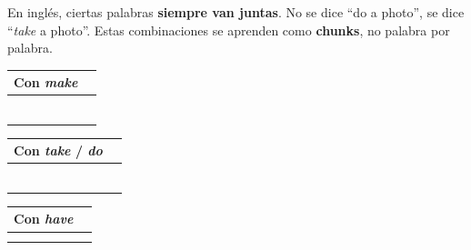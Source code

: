 \documentclass[12pt,a4paper]{article}
\begin{document}
\begin{cajachunk}
En inglés, ciertas palabras \textbf{siempre van juntas}. No se dice ``do a photo'', se dice ``\textit{take} a photo''. Estas combinaciones se aprenden como \textbf{chunks}, no palabra por palabra.

\medskip
\begin{multicols}{2}
\begin{tabularx}{\linewidth}{@{} l X @{}}
\toprule
\textbf{Con \textit{make}} & \\
\midrule
\eng{make a mistake} & \esp{cometer un error} \\
\eng{make a decision} & \esp{tomar una decisión} \\
\eng{make breakfast} & \esp{preparar el desayuno} \\
\eng{make money} & \esp{ganar dinero} \\
\eng{make a noise} & \esp{hacer ruido} \\
\eng{make friends} & \esp{hacer amigos} \\
\bottomrule
\end{tabularx}

\columnbreak

\begin{tabularx}{\linewidth}{@{} l X @{}}
\toprule
\textbf{Con \textit{take} / \textit{do}} & \\
\midrule
\eng{take a photo} & \esp{tomar una foto} \\
\eng{take a shower} & \esp{ducharse} \\
\eng{take a break} & \esp{tomar un descanso} \\
\eng{do homework} & \esp{hacer tarea} \\
\eng{do exercise} & \esp{hacer ejercicio} \\
\eng{do the dishes} & \esp{lavar los platos} \\
\bottomrule
\end{tabularx}
\end{multicols}

\medskip
\begin{tabularx}{\textwidth}{@{} l X @{}}
\toprule
\textbf{Con \textit{have}} & \\
\midrule
\eng{have a good time} \esp{pasarla bien} & \eng{have a meeting} \esp{tener una reunión} \\
\eng{have a conversation} \esp{tener una conversación} & \eng{have a problem} \esp{tener un problema} \\
\bottomrule
\end{tabularx}
\end{cajachunk}
\end{document}
